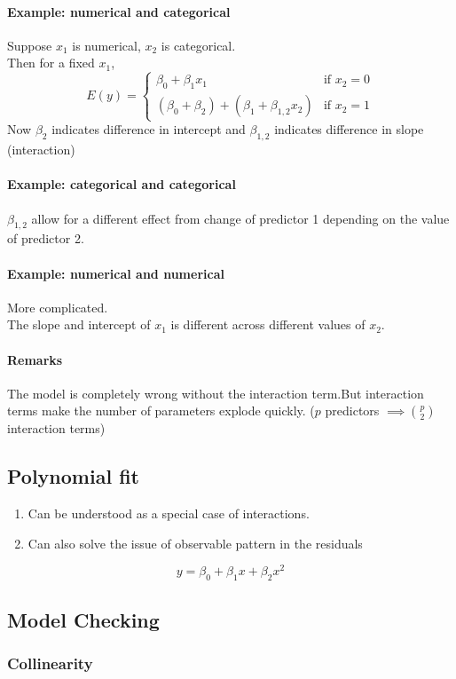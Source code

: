 \documentclass[11pt]{article}
\begin{document}
\paragraph{Example: numerical and categorical}
Suppose $x_1$ is numerical, $x_2$ is categorical.\\
Then for a fixed $x_1$, 
$$E(y) = \begin{cases}
	\beta_0 + \beta_1x_1 & \text{if $x_2 = 0$} \\
	(\beta_0 + \beta_2) + (\beta_1 + \beta_{1,2}x_2) & \text{if $x_2 = 1$}
\end{cases}$$
Now $\beta_2$ indicates difference in intercept and $\beta_{1,2}$ indicates difference in slope (interaction)
\paragraph{Example: categorical and categorical}
$\beta_{1,2}$ allow for a different effect from change of predictor 1 depending on the value of predictor 2.
\paragraph{Example: numerical and numerical}
More complicated. \\
The slope and intercept of $x_1$ is different across different values of $x_2$.
\paragraph{Remarks}
The model is completely wrong without the interaction term.But interaction terms make the number of parameters explode quickly. ($p$ predictors $\implies {p \choose 2}$ interaction terms)

\subsection{Polynomial fit}
\begin{enumerate}
	\item Can be understood as a special case of interactions. 
	\item Can also solve the issue of observable pattern in the residuals
\end{enumerate}
$$y = \beta_0 + \beta_1 x + \beta_2 x^2$$

\subsection{Model Checking}
\subsubsection{Collinearity}
\end{document}
